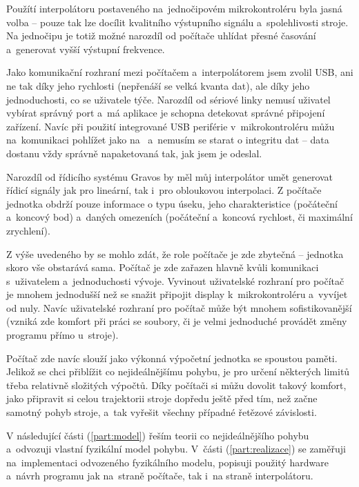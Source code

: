 	Použítí interpolátoru postaveného na~jednočipovém mikrokontroléru byla jasná volba -- pouze tak lze docílit kvalitního výstupního signálu a~spolehlivosti stroje. Na jednočipu je totiž možné narozdíl od počítače uhlídat přesné časování a~generovat vyšší výstupní frekvence.
	
	Jako komunikační rozhraní mezi počítačem a~interpolátorem jsem zvolil USB, ani ne tak díky jeho rychlosti (nepřenáší se velká kvanta dat), ale díky jeho jednoduchosti, co se uživatele týče. Narozdíl od sériové linky nemusí uživatel vybírat správný port a~má aplikace je schopna detekovat správné připojení zařízení. Navíc při použití integrované USB periférie v~mikrokontroléru můžu na~komunikaci pohlížet jako na~ a~nemusím se starat o integritu dat -- data dostanu vždy správně napaketovaná tak, jak jsem je odeslal.
	
	Narozdíl od řídicího systému Gravos by měl můj interpolátor umět generovat řídicí signály jak pro lineární, tak i~pro obloukovou interpolaci. Z počítače jednotka obdrží pouze informace o typu úseku, jeho charakteristice (počáteční a~koncový bod) a~daných omezeních (počáteční a~koncová rychlost, či maximální zrychlení).
	
	Z výše uvedeného by se mohlo zdát, že role počítače je zde zbytečná -- jednotka skoro vše obstarává sama. Počítač je zde zařazen hlavně kvůli komunikaci s~uživatelem a~jednoduchosti vývoje. Vyvinout uživatelské rozhraní pro počítač je mnohem jednodušší než se snažit připojit display k~mikrokontroléru a~vyvíjet od nuly. Navíc uživatelské rozhraní pro počítač může být mnohem sofistikovanější (vzniká zde komfort při práci se soubory, či je velmi jednoduché provádět změny programu přímo u~stroje).
	
	Počítač zde navíc slouží jako výkonná výpočetní jednotka se spoustou paměti. Jelikož se chci přiblížit co nejideálnějšímu pohybu, je pro určení některých limitů třeba relativně složitých výpočtů. Díky počítači si můžu dovolit takový komfort, jako připravit si celou trajektorii stroje dopředu ještě před tím, než začne samotný pohyb stroje, a~tak vyřešit všechny případné řetězové závislosti.
	
	V následující části  (\ref{part:model}) řeším teorii co nejideálnějšího pohybu a~odvozuji vlastní fyzikální model pohybu. V~části  (\ref{part:realizace}) se zaměřuji na~implementaci odvozeného fyzikálního modelu, popisuji použitý hardware a~návrh programu jak na~straně počítače, tak i~na straně interpolátoru.
	
	